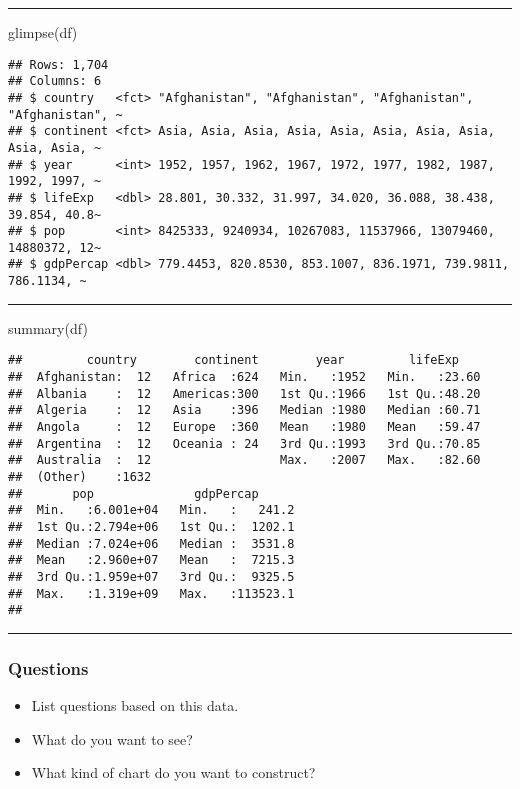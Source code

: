 \documentclass[
]{article}
\newenvironment{Shaded}{\begin{snugshade}}{\end{snugshade}}
\newcommand{\FunctionTok}[1]{\textcolor[rgb]{0.00,0.00,0.00}{#1}}
\newcommand{\NormalTok}[1]{#1}
\providecommand{\tightlist}{%
  \setlength{\itemsep}{0pt}\setlength{\parskip}{0pt}}
\begin{document}
\begin{center}\rule{0.5\linewidth}{0.5pt}\end{center}

\begin{Shaded}
\begin{Highlighting}[]
\FunctionTok{glimpse}\NormalTok{(df)}
\end{Highlighting}
\end{Shaded}

\begin{verbatim}
## Rows: 1,704
## Columns: 6
## $ country   <fct> "Afghanistan", "Afghanistan", "Afghanistan", "Afghanistan", ~
## $ continent <fct> Asia, Asia, Asia, Asia, Asia, Asia, Asia, Asia, Asia, Asia, ~
## $ year      <int> 1952, 1957, 1962, 1967, 1972, 1977, 1982, 1987, 1992, 1997, ~
## $ lifeExp   <dbl> 28.801, 30.332, 31.997, 34.020, 36.088, 38.438, 39.854, 40.8~
## $ pop       <int> 8425333, 9240934, 10267083, 11537966, 13079460, 14880372, 12~
## $ gdpPercap <dbl> 779.4453, 820.8530, 853.1007, 836.1971, 739.9811, 786.1134, ~
\end{verbatim}

\begin{center}\rule{0.5\linewidth}{0.5pt}\end{center}

\begin{Shaded}
\begin{Highlighting}[]
\FunctionTok{summary}\NormalTok{(df)}
\end{Highlighting}
\end{Shaded}

\begin{verbatim}
##         country        continent        year         lifeExp     
##  Afghanistan:  12   Africa  :624   Min.   :1952   Min.   :23.60  
##  Albania    :  12   Americas:300   1st Qu.:1966   1st Qu.:48.20  
##  Algeria    :  12   Asia    :396   Median :1980   Median :60.71  
##  Angola     :  12   Europe  :360   Mean   :1980   Mean   :59.47  
##  Argentina  :  12   Oceania : 24   3rd Qu.:1993   3rd Qu.:70.85  
##  Australia  :  12                  Max.   :2007   Max.   :82.60  
##  (Other)    :1632                                                
##       pop              gdpPercap       
##  Min.   :6.001e+04   Min.   :   241.2  
##  1st Qu.:2.794e+06   1st Qu.:  1202.1  
##  Median :7.024e+06   Median :  3531.8  
##  Mean   :2.960e+07   Mean   :  7215.3  
##  3rd Qu.:1.959e+07   3rd Qu.:  9325.5  
##  Max.   :1.319e+09   Max.   :113523.1  
## 
\end{verbatim}

\begin{center}\rule{0.5\linewidth}{0.5pt}\end{center}

\hypertarget{questions}{%
\subsubsection{Questions}\label{questions}}

\begin{itemize}
\tightlist
\item
  List questions based on this data.
\item
  What do you want to see?
\item
  What kind of chart do you want to construct?
\end{itemize}
\end{document}
